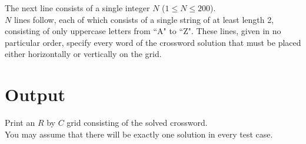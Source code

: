 \noindent The next line consists of a single integer $N$ ($1 \leq N \leq 200$).\\

\noindent $N$ lines follow, each of which consists of a single string of at least length 2, consisting of only uppercase letters from ``A" to ``Z". These lines, given in no particular order, specify every word of the crossword solution that must be placed either horizontally or vertically on the grid.

\section*{Output}

\noindent Print an $R$ by $C$ grid consisting of the solved crossword.\\
You may assume that there will be exactly one solution in every test case.\\
